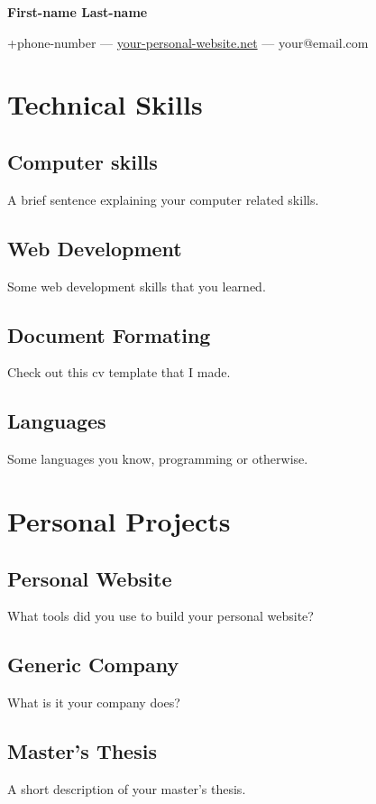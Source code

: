 \documentclass{article}
\begin{document}
\pagestyle{empty}


\begingroup
    \centering 
    {\Huge\bfseries First-name Last-name}
    
    \vspace{.5in}
    \large +phone-number --- \url{your-personal-website.net} --- your@email.com
\endgroup
\vfill


\section*{Technical Skills}
\subsection*{Computer skills}
A brief sentence explaining your computer related skills.

\subsection*{Web Development}
Some web development skills that you learned.

\subsection*{Document Formating}
Check out this cv template that I made.

\subsection*{Languages}
Some languages you know, programming or otherwise.


\section*{Personal Projects}
\subsection*{Personal Website}
What tools did you use to build your personal website?

\subsection*{Generic Company}
What is it your company does?

\subsection*{Master's Thesis}
A short description of your master's thesis.
\end{document}
